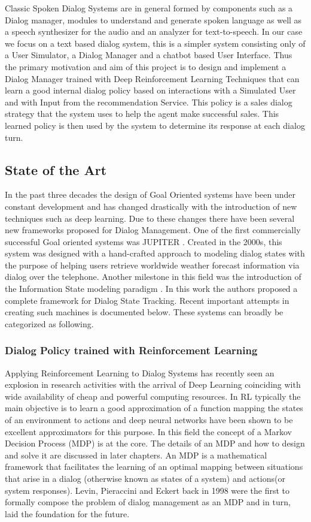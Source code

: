 \documentclass[12pt]{extarticle}
\numberwithin{equation}{section}
\begin{document}
	Classic Spoken Dialog Systems are in general formed by components such as a Dialog manager, modules to understand and generate spoken language as well as a speech synthesizer for the audio and an analyzer for text-to-speech. In our case we focus on a text based dialog system, this is a simpler system consisting only of a User Simulator, a Dialog Manager and a chatbot based User Interface. Thus the primary motivation and aim of this project is to design and implement a Dialog Manager trained with Deep Reinforcement Learning Techniques that can learn a good internal dialog policy based on interactions with a Simulated User and with Input from the recommendation Service. This policy is a sales dialog strategy that the system uses to help the agent make successful sales. This learned policy is then used by the system to determine its response at each dialog turn.
	\subsection{State of the Art}
	In the past three decades the design of Goal Oriented systems have been under constant development and has changed drastically with the introduction of new techniques such as deep learning. Due to these changes there have been several new frameworks proposed for Dialog Management. One of the first commercially successful Goal oriented systems was JUPITER \cite{zue_jupiter}. Created in the 2000s, this system was designed with a hand-crafted approach to modeling dialog states with the purpose of helping users retrieve worldwide weather forecast information via dialog over the telephone. Another milestone in this field was the introduction of the Information State modeling paradigm \cite{Larsson:2000:ISD:973935.973943}. In this work the authors proposed a complete framework for Dialog State Tracking.
	Recent important attempts in creating such machines is documented below. These systems can broadly be categorized as following.
	\subsubsection{Dialog Policy trained with Reinforcement Learning}
	Applying Reinforcement Learning to Dialog Systems has recently seen an explosion in research activities with the arrival of Deep Learning coinciding with wide availability of cheap and powerful computing resources. In RL typically the main objective is to learn a good approximation of a function mapping the states of an environment to actions and deep neural networks have been shown to be excellent approximators for this purpose. In this field the concept of a Markov Decision Process (MDP) is at the core. The details of an MDP and how to design and solve it are discussed in later chapters. An MDP is a mathematical framework that facilitates the learning of an optimal mapping between situations that arise in a dialog (otherwise known as states of a system) and actions(or system responses)\cite{mdp-bellmann}. Levin, Pieraccini and Eckert back in 1998 were the first to formally compose the problem of dialog management as an MDP \cite{mdp-pieraccini} and in turn, laid the foundation for the future.
	
\end{document}
